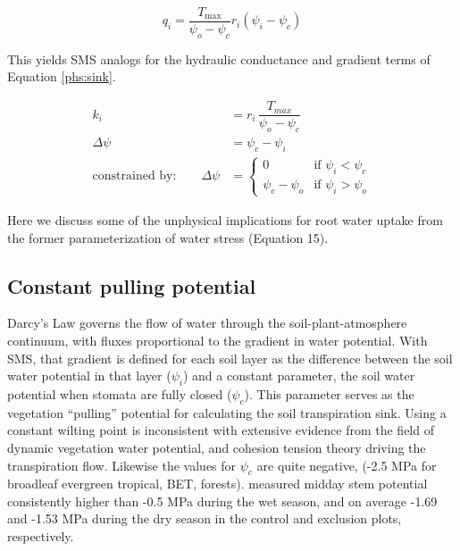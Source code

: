 \documentclass[draft,linenumbers]{agujournal}
\begin{document}
    \begin{linenomath*}
    \begin{equation} 
    q_i = \dfrac{T_{\text{max}}}{\psi_{o}-\psi_{c}} r_i \left(\psi_i-\psi_{c} \right)
    \end{equation}
    \end{linenomath*}
    
    This yields SMS analogs for the hydraulic conductance and gradient terms of Equation \ref{phs:sink}.
    \begin{linenomath*}
    \begin{equation} \begin{aligned}
    k_i &= r_i \, \dfrac{T_{max}}{\psi_{o}-\psi_{c}} \\
    \Delta\psi &=  \psi_{c}-\psi_i \\
    \mbox{constrained by:} \qquad
    \Delta\psi &=
    \begin{cases}
    0                          & \text{if } \psi_i<\psi_{c}  \\
    \psi_{c}-\psi_{o} & \text{if } \psi_i>\psi_{o}
    \label{kb}
    \end{cases}
    \end{aligned}\end{equation}
    \end{linenomath*}

    Here we discuss some of the unphysical implications for root water uptake from the former parameterization of water stress (Equation 15).
    
    \subsection{Constant pulling potential}
    Darcy's Law governs the flow of water through the soil-plant-atmosphere continuum, 
    with fluxes proportional to the gradient in water potential. 
    With SMS, that gradient is defined for each soil layer as 
    the difference between the soil water potential in that layer ($\psi_i$) 
    and a constant parameter, the soil water potential when stomata are fully closed ($\psi_{c}$).
    This parameter serves as the vegetation ``pulling'' potential for calculating the soil transpiration sink.
    Using a constant wilting point is inconsistent with extensive evidence from the field of dynamic vegetation water potential, and cohesion tension theory driving the transpiration flow.
    Likewise the values for $\psi_{c}$ are quite negative, (-2.5 MPa for broadleaf evergreen tropical, BET, forests). 
    \cite{fisher2006} measured midday stem potential consistently higher than -0.5 MPa during the wet season, and on average -1.69 and -1.53 MPa during the dry season in the control and exclusion plots, respectively.
    
\end{document}
